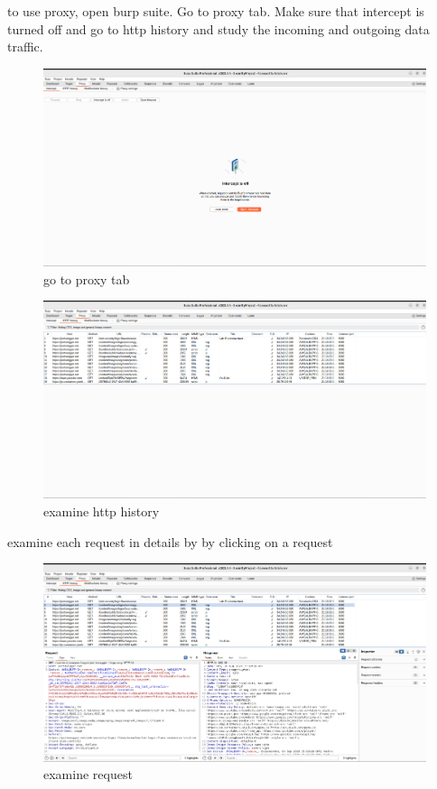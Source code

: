\documentclass[
	a4paper, %
	12pt, %
]{CSSullivanBusinessReport}
\begin{document}
\begin{fullwidth}
    to use proxy, open burp suite. Go to proxy tab. Make sure that intercept is turned off and go to http history and study the incoming and outgoing data traffic.
\end{fullwidth}
\begin{figure}[H]
    \centering
    \includegraphics[width=1\textwidth]{Images/anikaScreensots/Proxy1.png}
    \caption{go to proxy tab}
    \label{fig:enter-label}
\end{figure}

\begin{figure}[H]
    \centering
    \includegraphics[width=1\textwidth]{Images/anikaScreensots/proxy2.png}
    \caption{examine http history}
    \label{fig:enter-label}
\end{figure}
examine each request in details by by clicking on a request

\begin{figure}[H]
    \centering
    \includegraphics[width=1\textwidth]{Images/anikaScreensots/proxy3.png}
    \caption{examine request}
    \label{fig:enter-label}
\end{figure}
\end{document}
